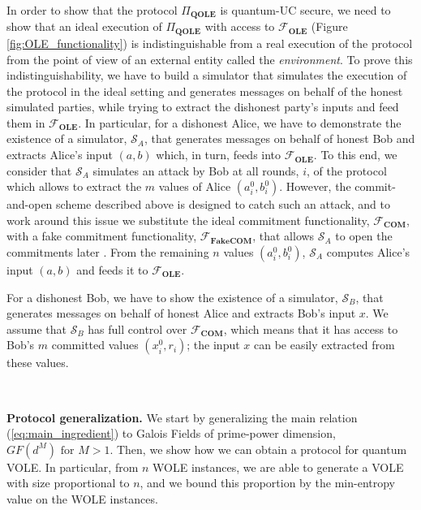 In order to show that the protocol $\Pi_{\textbf{QOLE}}$ is quantum-UC secure, we need to show that an ideal execution of $\Pi_{\textbf{QOLE}}$ with access to $\mathcal{F}_{\textbf{OLE}}$ (Figure \ref{fig:OLE_functionality}) is indistinguishable from a real execution of the protocol from the point of view of an external entity called the \textit{environment}. To prove this indistinguishability, we have to build a simulator that simulates the execution of the protocol in the ideal setting and generates messages on behalf of the honest simulated parties,  while trying to extract the dishonest party's inputs and feed them in $\mathcal{F}_{\textbf{OLE}}$. In particular, for a dishonest Alice, we have to demonstrate the existence of a simulator, $\mathcal{S}_A$, that generates messages on behalf of honest Bob and extracts Alice's input $(a,b)$ which, in turn, feeds into $\mathcal{F}_{\textbf{OLE}}$.  To this end, we consider that $\mathcal{S}_A$ simulates an attack by Bob at all rounds, $i$, of the protocol  which allows to extract the $m$ values of Alice  $(a^0_i,b^0_i)$. However, the commit-and-open scheme described above is designed to catch such an attack, and to work around this issue we substitute the ideal commitment functionality, $\mathcal{F}_{\textbf{COM}}$, with a fake commitment functionality, $\mathcal{F}_{\textbf{FakeCOM}}$, that allows $\mathcal{S}_A$ to open the commitments later \cite{Unruh10}.  From the remaining $n$ values $(a^0_i,b^0_i)$, $\mathcal{S}_A$ computes Alice's input $(a,b)$ and feeds it to $\mathcal{F}_{\textbf{OLE}}$.

For a dishonest Bob, we have to show the existence of a simulator, $\mathcal{S}_B$, that generates messages on behalf of  honest Alice and extracts Bob's input $x$. We assume that $\mathcal{S}_B$ has full control over  $\mathcal{F}_{\textbf{COM}}$, which means that it has access to Bob's $m$ committed values $(x^0_i, r_i)$;  the input $x$ can be easily extracted from these values. %

\

\noindent\textbf{Protocol generalization.}  We start by generalizing   the main relation (\ref{eq:main_ingredient}) to Galois Fields of prime-power dimension, $GF(d^M) \text{ for }M>1$. Then, we show how we can obtain a protocol for quantum VOLE. In particular, from $n$ WOLE instances, we are able to generate a VOLE with size proportional to $n$, and we  bound this proportion by the min-entropy value on the WOLE instances.


